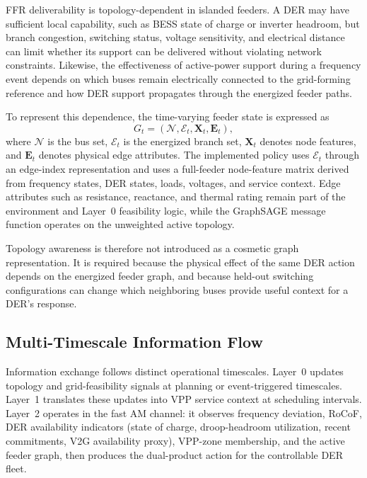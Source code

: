 FFR deliverability is topology-dependent in islanded feeders. A DER may
have sufficient local capability, such as BESS state of charge or
inverter headroom, but branch congestion, switching status, voltage
sensitivity, and electrical distance can limit whether its support can
be delivered without violating network constraints. Likewise, the
effectiveness of active-power support during a frequency event depends
on which buses remain electrically connected to the grid-forming
reference and how DER support propagates through the energized feeder
paths.

To represent this dependence, the time-varying feeder state is expressed
as
\begin{equation}
    G_t=(\mathcal{N},\mathcal{E}_t,\mathbf{X}_t,\mathbf{E}_t),
\end{equation}
where $\mathcal{N}$ is the bus set, $\mathcal{E}_t$ is the energized
branch set, $\mathbf{X}_t$ denotes node features, and $\mathbf{E}_t$
denotes physical edge attributes. The implemented policy uses
$\mathcal{E}_t$ through an edge-index representation and uses a
full-feeder node-feature matrix derived from frequency states, DER
states, loads, voltages, and service context. Edge attributes such as
resistance, reactance, and thermal rating remain part of the environment
and Layer~0 feasibility logic, while the GraphSAGE message function
operates on the unweighted active topology.

Topology awareness is therefore not introduced as a cosmetic graph
representation. It is required because the physical effect of the same
DER action depends on the energized feeder graph, and because held-out
switching configurations can change which neighboring buses provide
useful context for a DER's response.

\subsection{Multi-Timescale Information Flow}
\label{ssec:multitimescale_flow}

Information exchange follows distinct operational timescales. Layer~0
updates topology and grid-feasibility signals at planning or
event-triggered timescales. Layer~1 translates these updates into VPP
service context at scheduling intervals. Layer~2 operates in the fast
AM channel: it observes frequency deviation, RoCoF, DER availability
indicators (state of charge, droop-headroom utilization, recent
commitments, V2G availability proxy), VPP-zone membership, and the
active feeder graph, then produces the dual-product action for the
controllable DER fleet.

